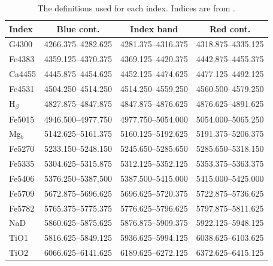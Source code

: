 		\begin{table}
			\centering
			\caption{The definitions used for each index. Indices are from \citet{Trager1998}.}
			\label{tab:abIndex}
			\begin{tabular}{l c c c}
				\hline
				\hline
				Index 	& Blue cont. 		& Index band 		& Red cont. \\
				\hline 
				G4300 	& 4266.375--4282.625 & 4281.375--4316.375 & 4318.875--4335.125 \\
				Fe4383 	& 4359.125--4370.375 & 4369.125--4420.375 & 4442.875--4455.375 \\
				Ca4455 	& 4445.875--4454.625 & 4452.125--4474.625 & 4477.125--4492.125 \\
				Fe4531 	& 4504.250--4514.250 & 4514.250--4559.250 & 4560.500--4579.250 \\
				H$_\beta$ & 4827.875--4847.875 & 4847.875--4876.625 & 4876.625--4891.625 \\
				Fe5015 	& 4946.500--4977.750 & 4977.750--5054.000 & 5054.000--5065.250 \\
				Mg$_b$ 	& 5142.625--5161.375 & 5160.125--5192.625 & 5191.375--5206.375 \\
				Fe5270 	& 5233.150--5248.150 & 5245.650--5285.650 & 5285.650--5318.150 \\
				Fe5335 	& 5304.625--5315.875 & 5312.125--5352.125 & 5353.375--5363.375 \\
				Fe5406 	& 5376.250--5387.500 & 5387.500--5415.000 & 5415.000--5425.000 \\
				Fe5709 	& 5672.875--5696.625 & 5696.625--5720.375 & 5722.875--5736.625 \\
				Fe5782 	& 5765.375--5775.375 & 5776.625--5796.625 & 5797.875--5811.625 \\
				NaD 	& 5860.625--5875.625 & 5876.875--5909.375 & 5922.125--5948.125 \\
				TiO1 	& 5816.625--5849.125 & 5936.625--5994.125 & 6038.625--6103.625 \\
				TiO2 	& 6066.625--6141.625 & 6189.625--6272.125 & 6372.625--6415.125 \\
				\hline
				\hline
			\end{tabular}
		\end{table}


